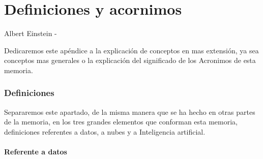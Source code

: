 \chapter{Definiciones y acornimos}
\label{Appendix:1}

 {Albert Einstein}
-

Dedicaremos este apéndice a la explicación de conceptos en mas extensión, ya sea conceptos mas generales o la explicación del significado de los Acronimos de esta memoria.

\subsection{Definiciones}

Separaremos este apartado, de la misma manera que se ha hecho en otras partes de la memoria, en los tres grandes elementos que conforman esta memoria, definiciones referentes a datos, a nubes y a Inteligencia artificial.

\subsubsection{Referente a datos}

